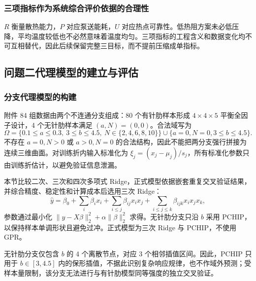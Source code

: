 \documentclass[12pt,a4paper]{article}
\begin{document}
\subsubsection{三项指标作为系统综合评价依据的合理性}
$R$ 衡量散热能力，$P$ 对应泵送能耗，$U$ 对应热点可靠性。低热阻方案未必低压降，平均温度较低也不必然意味着温度均匀。三项指标的工程含义和数据变化均不可互相替代，因此后续保留完整三目标，而不提前压缩成单指标。

\subsection{问题二代理模型的建立与评估}
\subsubsection{分支代理模型的构建}
附件 84 组数据由两个不连通分支组成：80 个有针肋样本形成 $4\times4\times5$ 平衡全因子设计，4 个无针肋样本满足 $(a,N)=(0,0)$。合法域写为
\begin{equation}
\Omega=\{0.1\le a\le0.3,\ 3\le b\le4.5,\ N\in\{2,4,6,8,10\}\}
\cup\{a=0,N=0,3\le b\le4.5\}.
\end{equation}
不存在 $a=0,N>0$ 或 $a>0,N=0$ 的合法结构，因此不能把两分支强行拼接为连续三维曲面。对训练折内输入标准化为 $\xi_j=(x_j-\mu_j)/s_j$，所有标准化参数只由训练折估计，以避免验证信息泄漏。

本节比较二次、三次和四次多项式 Ridge，正式模型依据嵌套重复交叉验证结果，并综合精度、稳定性和计算成本后选用三次 Ridge：
\begin{equation}\hat y=\beta_0+\sum_i\beta_i x_i+\sum_{i\le j}\beta_{ij}x_ix_j+\sum_{i\le j\le k}\beta_{ijk}x_ix_jx_k,\end{equation}
参数通过最小化 $\|y-X\beta\|_2^2+\alpha\|\beta\|_2^2$ 求得。无针肋分支只沿 $b$ 采用 PCHIP，以保持样本单调形状且避免过冲。正式模型为三次 Ridge 与 PCHIP，不使用 GPR。

无针肋分支仅包含 $b$ 的 4 个离散节点，对应 3 个相邻插值区间。因此，PCHIP 只用于 $b\in[3,4.5]$ 内的保形插值，不据此识别复杂响应规律，也不作域外预测；受样本量限制，该分支无法进行与有针肋模型同等强度的独立交叉验证。
\end{document}
